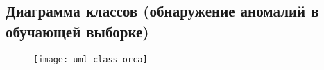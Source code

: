 \begin{landscape}
\chapter{Диаграмма классов (обнаружение аномалий в обучающей выборке)}
\label{app:UML:Class:Orca}
\begin{figure}[H]
\texttt{[image: uml\_class\_orca]}
\end{figure}
\end{landscape}